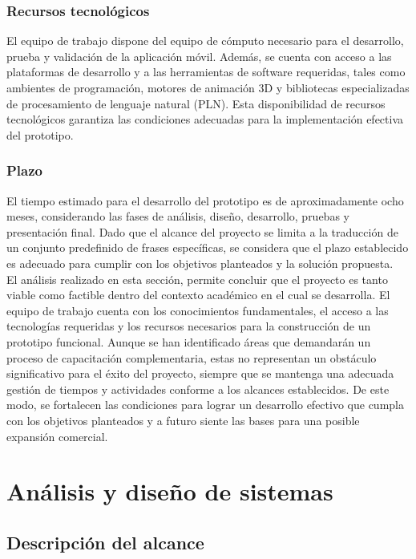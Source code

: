 \subsubsection{Recursos tecnológicos}
El equipo de trabajo dispone del equipo de cómputo necesario para el desarrollo, prueba y validación de la aplicación móvil. Además, se cuenta con acceso a las plataformas de desarrollo y a las herramientas de software requeridas, tales como ambientes de programación, motores de animación 3D y bibliotecas especializadas de procesamiento de lenguaje natural (PLN). Esta disponibilidad de recursos tecnológicos garantiza las condiciones adecuadas para la implementación efectiva del prototipo.

\subsubsection{Plazo}
El tiempo estimado para el desarrollo del prototipo es de aproximadamente ocho meses, considerando las fases de análisis, diseño, desarrollo, pruebas y presentación final. Dado que el alcance del proyecto se limita a la traducción de un conjunto predefinido de frases específicas, se considera que el plazo establecido es adecuado para cumplir con los objetivos planteados y la solución propuesta. \\


El análisis realizado en esta sección, permite concluir que el proyecto es tanto viable como factible dentro del contexto académico en el cual se desarrolla. El equipo de trabajo cuenta con los conocimientos fundamentales, el acceso a las tecnologías requeridas y los recursos necesarios para la construcción de un prototipo funcional. Aunque se han identificado áreas que demandarán un proceso de capacitación complementaria, estas no representan un obstáculo significativo para el éxito del proyecto, siempre que se mantenga una adecuada gestión de tiempos y actividades conforme a los alcances establecidos. De este modo, se fortalecen las condiciones para lograr un desarrollo efectivo que cumpla con los objetivos planteados y a futuro siente las bases para una posible expansión comercial.

\section{Análisis y diseño de sistemas}
\subsection{Descripción del alcance}
